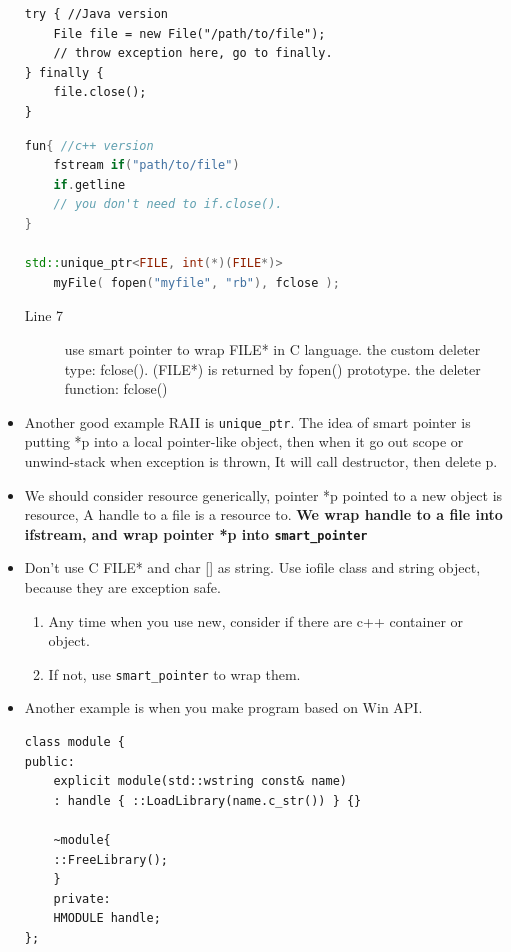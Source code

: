 \documentclass[a4paper,11pt,twoside]{book}
\begin{document}
\begin{itemize}
\begin{lstlisting}[numbers = none]
try { //Java version
	File file = new File("/path/to/file");
	// throw exception here, go to finally.
} finally {
	file.close();
}
\end{lstlisting}
	
\begin{lstlisting}[frame=single, language=c++]
fun{ //c++ version
	fstream if("path/to/file")
	if.getline
	// you don't need to if.close().
}
	
std::unique_ptr<FILE, int(*)(FILE*)> 
	myFile( fopen("myfile", "rb"), fclose );              
\end{lstlisting}
\begin{description}
	\item[Line 7] use smart pointer to wrap FILE* in C language. the custom deleter type: fclose(). (FILE*) is returned by fopen() prototype. the deleter function: fclose() 
\end{description}
	
	\item Another good example RAII is \texttt{unique\_ptr}. The idea of smart pointer is putting *p into a local pointer-like object, then when it go out scope or unwind-stack when exception is thrown, It will call destructor, then delete p.
	
	\item We should consider resource generically, pointer *p pointed to a new object is resource, A handle to a file is a resource to. \textbf{We wrap handle to a file into ifstream, and wrap pointer *p into \texttt{smart\_pointer}}
	

	\item Don't use C FILE* and char [] as string. Use iofile class and string object, because they are exception safe.
	\begin{enumerate}
		\item Any time when you use new, consider if there are c++ container or object.
		\item If not, use \texttt{smart\_pointer} to wrap them.
	\end{enumerate}
	
\item Another example is when you make program based on Win API.
\begin{lstlisting}[numbers=none]
class module {
public:
	explicit module(std::wstring const& name)
	: handle { ::LoadLibrary(name.c_str()) } {}
	
	~module{
	::FreeLibrary();
	}
	private:
	HMODULE handle;
};
	\end{lstlisting}
\end{itemize}
\end{document}
